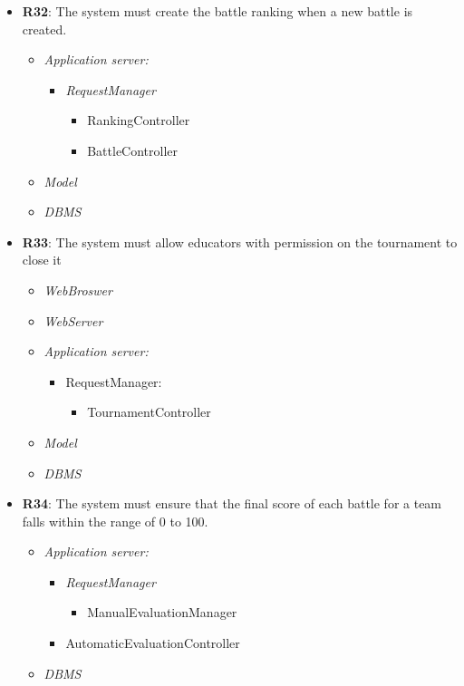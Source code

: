 \begin{itemize}
            \item \textbf{R32}: The system must create  the battle ranking when a new battle is created.
            \begin{itemize}
            \item \textit{Application server:}
            \begin{itemize}
                 \item \textit{RequestManager} \begin{itemize}
                     \item RankingController
                     \item BattleController
                 \end{itemize}
            \end{itemize}
            \item \textit{Model}
            \item \textit{DBMS}
                \end{itemize}


            \item \textbf{R33}: The system must allow educators with permission on the tournament to close it
            \begin{itemize}
                 \item \textit{WebBroswer}
                \item \textit{WebServer}
                \item \textit{Application server:}\begin{itemize}
                    \item RequestManager:\begin{itemize}
                        \item TournamentController
                    \end{itemize}
                \end{itemize}
                \item \textit{Model}
                \item \textit{DBMS}
                \end{itemize}


            \item \textbf{R34}: The system must ensure that the final score of each battle for a team falls within the range of 0 to 100.
            \begin{itemize}
            \item \textit{Application server:}
            \begin{itemize}
                 \item \textit{RequestManager} \begin{itemize}
                     \item ManualEvaluationManager
                 \end{itemize}
          \item AutomaticEvaluationController
            \end{itemize}
            \item \textit{DBMS}
                \end{itemize}


\end{itemize}
